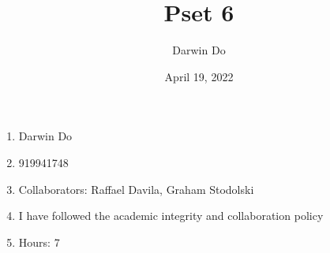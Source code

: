 \documentclass{article}
\title{Pset 6}
\begin{document}
\newcommand{\Not}{\textbf{not}}
\newcommand{\AAnd}{\textbf{and}}
\newcommand{\Or}{\textbf{or}}
\newcommand{\True}{\texttt{True} }
\newcommand{\False}{\texttt{False} }

\date{April 19, 2022 }
\author{Darwin Do}

\maketitle

\begin{enumerate}
    \item Darwin Do
    \item 919941748
    \item Collaborators: Raffael Davila, Graham Stodolski
    \item I have followed the academic integrity and collaboration policy
    \item Hours: 7
\end{enumerate}

\newpage
\end{document}
